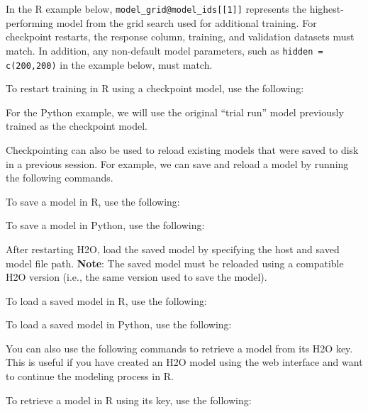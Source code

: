 {{In the R example below, \texttt{model\_grid@model\_ids[[1]]} represents the highest-performing model from the grid search used for additional training. For checkpoint restarts, the response column, training, and validation datasets must match.  In addition, any non-default model parameters, such as \texttt{hidden = c(200,200)} in the example below, must match. 

\waterExampleInR
To restart training in R using a checkpoint model, use the following: 


\newpage
\waterExampleInPython
For the Python example, we will use the original ``trial run'' model previously trained as the checkpoint model.
\medskip


\noindent
Checkpointing can also be used to reload existing models that were saved to disk in a previous session. For example, we can save and reload a model by running the following commands.

\waterExampleInR
To save a model in R, use the following: 
\medskip

\newpage
\waterExampleInPython
To save a model in Python, use the following: 
\medskip



\normalsize

\noindent
After restarting  H2O, load the saved model by specifying the host and saved model file path. \textbf{Note}: The saved model must be reloaded using a compatible H2O version (i.e., the same version used to save the model).

\normalsize
\waterExampleInR
To load a saved model in R, use the following: 


\waterExampleInPython
To load a saved model in Python, use the following: 



\noindent
You can also use the following commands to retrieve a model from its H2O key. This is useful if you have created an H2O model using the web interface and want to continue the modeling process in R.

\waterExampleInR
To retrieve a model in R using its key, use the following: 


}}

